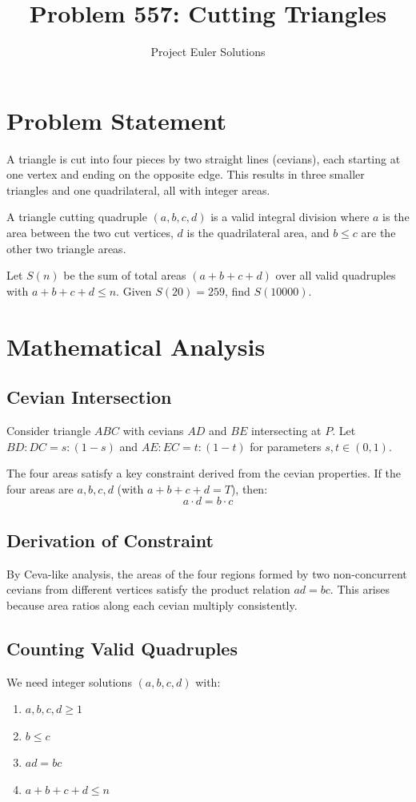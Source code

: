 \documentclass[11pt]{article}
\title{Problem 557: Cutting Triangles}
\author{Project Euler Solutions}
\date{}
\begin{document}
\maketitle

\section{Problem Statement}
A triangle is cut into four pieces by two straight lines (cevians), each starting at one vertex and ending on the opposite edge. This results in three smaller triangles and one quadrilateral, all with integer areas.

A triangle cutting quadruple $(a, b, c, d)$ is a valid integral division where $a$ is the area between the two cut vertices, $d$ is the quadrilateral area, and $b \leq c$ are the other two triangle areas.

Let $S(n)$ be the sum of total areas $(a+b+c+d)$ over all valid quadruples with $a + b + c + d \leq n$. Given $S(20) = 259$, find $S(10000)$.

\section{Mathematical Analysis}

\subsection{Cevian Intersection}
Consider triangle $ABC$ with cevians $AD$ and $BE$ intersecting at $P$. Let $BD:DC = s:(1-s)$ and $AE:EC = t:(1-t)$ for parameters $s,t \in (0,1)$.

The four areas satisfy a key constraint derived from the cevian properties. If the four areas are $a, b, c, d$ (with $a + b + c + d = T$), then:
\[
a \cdot d = b \cdot c
\]

\subsection{Derivation of Constraint}
By Ceva-like analysis, the areas of the four regions formed by two non-concurrent cevians from different vertices satisfy the product relation $ad = bc$. This arises because area ratios along each cevian multiply consistently.

\subsection{Counting Valid Quadruples}
We need integer solutions $(a, b, c, d)$ with:
\begin{enumerate}
    \item $a, b, c, d \geq 1$
    \item $b \leq c$
    \item $ad = bc$
    \item $a + b + c + d \leq n$
\end{enumerate}
\end{document}
